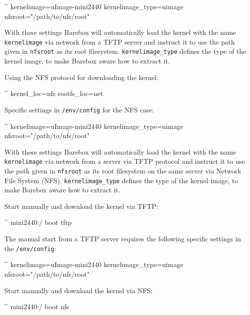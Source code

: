\begin{ptxshell}[escapechar=|]{^}
kernelimage=uImage-mini2440
kernelimage_type=uimage
nfsroot="/path/to/nfs/root"
\end{ptxshell}

With these settings Barebox will automatically load the kernel with the name
\texttt{kernelimage} via network from a TFTP server and instruct it to use
the path given in \texttt{nfsroot} as its root filesystem.
\texttt{kernelimage\_type} defines the type of the kernel image, to make
Barebox aware how to extract it.

Using the NFS protocol for downloading the kernel:

\begin{ptxshell}[escapechar=|]{^}
kernel_loc=nfs
rootfs_loc=net
\end{ptxshell}

Specific settings in \texttt{/env/config} for the NFS case:

\begin{ptxshell}[escapechar=|]{^}
kernelimage=uImage-mini2440
kernelimage_type=uimage
nfsroot="/path/to/nfs/root"
\end{ptxshell}

With these settings Barebox will automatically load the kernel with the name
\texttt{kernelimage} via network from a server via TFTP protocol and instruct
it to use the path given in \texttt{nfsroot} as its root filesystem on the
same server via Network File System (NFS).
\texttt{kernelimage\_type} defines the type of the kernel image, to make
Barebox aware how to extract it.

Start manually and download the kernel via TFTP:

\begin{ptxshell}[escapechar=|]{^}
mini2440:/ boot tftp
\end{ptxshell}

The manual start from a TFTP server requires the following specific settings
in the \texttt{/env/config}:

\begin{ptxshell}[escapechar=|]{^}
kernelimage=uImage-mini2440
kernelimage_type=uimage
nfsroot="/path/to/nfs/root"
\end{ptxshell}

Start manually and download the kernel via NFS:

\begin{ptxshell}[escapechar=|]{^}
mini2440:/ boot nfs
\end{ptxshell}

